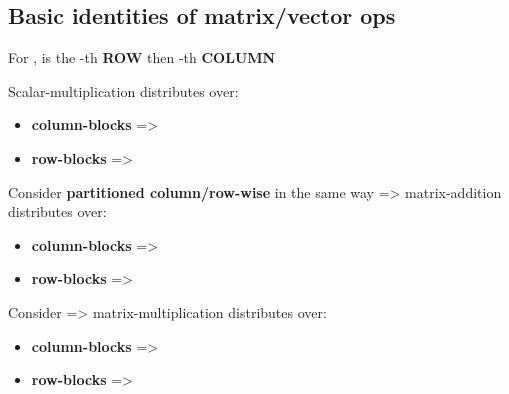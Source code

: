 \subsection*{Basic identities of matrix/vector ops}

  
 

\hSep %

For ,  is the -th \textbf{ROW} then -th \textbf{COLUMN} \\

\hSep %

Scalar-multiplication distributes over:
\begin{itemize}
  \item
    \textbf{column-blocks} =\textgreater{}
  \item
    \textbf{row-blocks} =\textgreater{}
\end{itemize}

Consider  \textbf{partitioned  column/row-wise} in the same way => matrix-addition distributes over:
\begin{itemize}
  \item
    \textbf{column-blocks} =>
  \item
    \textbf{row-blocks} =>
  \end{itemize}

Consider 
  => matrix-multiplication distributes over:
\begin{itemize}
  \item
    \textbf{column-blocks} =\textgreater{}
  \item
    \textbf{row-blocks} =\textgreater{}
\end{itemize}

